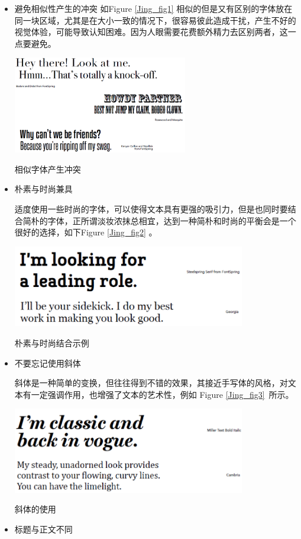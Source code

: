 \documentclass[a4paper]{article}
\begin{document}
\begin{itemize}
	\item 避免相似性产生的冲突
	如Figure \ref{Jing_fig1} 相似的但是又有区别的字体放在同一块区域，尤其是在大小一致的情况下，很容易彼此造成干扰，产生不好的视觉体验，可能导致认知困难。因为人眼需要花费额外精力去区别两者，这一点要避免。

\makeatletter
\def\@captype{figure}
\makeatother
\centerline{\includegraphics [width=0.6\textwidth]{Jing_fig1.png} }
\caption{ 相似字体产生冲突}
\label{Jing_fig1}	
	
	\item 朴素与时尚兼具
	
	适度使用一些时尚的字体，可以使得文本具有更强的吸引力，但是也同时要结合简朴的字体，正所谓淡妆浓抹总相宜，达到一种简朴和时尚的平衡会是一个很好的选择，如下Figure \ref{Jing_fig2} 。
	
\makeatletter
\def\@captype{figure}
\makeatother
\centerline{\includegraphics [width=0.8\textwidth]{Jing_fig2.png} }
\caption{朴素与时尚结合示例 }
\label{Jing_fig2}

	\item 不要忘记使用斜体
	
	斜体是一种简单的变换，但往往得到不错的效果，其接近手写体的风格，对文本有一定强调作用，也增强了文本的艺术性，例如 Figure \ref{Jing_fig3}~所示。
	
\makeatletter
\def\@captype{figure}
\makeatother
\centerline{\includegraphics [width=0.8\textwidth]{Jing_fig3.png} }
\caption{斜体的使用 }
\label{Jing_fig3}
	\item 标题与正文不同
	

\end{itemize}
\end{document}
